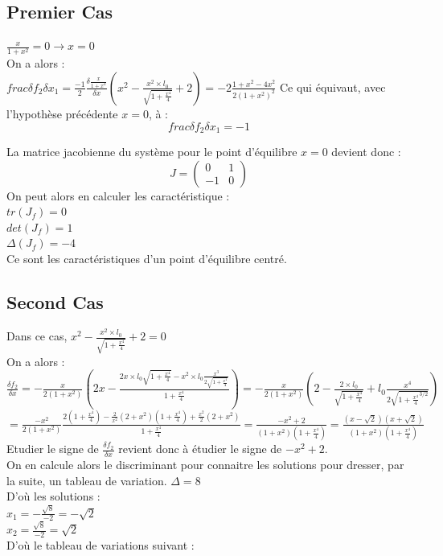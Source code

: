 \documentclass[10pt,a4paper]{article}
\begin{document}
\subsection*{Premier Cas}
$\frac{x}{1+x^2}=0 \longrightarrow x=0$\\
On a alors :\\
$frac{\delta f_2}{\delta x_1}=\frac{-1}{2}\frac{\delta \frac{x}{1+x^2}}{\delta x}(x^2 - \frac{x^2\times l_0}{\sqrt{1+\frac{x^4}{4}}}+2)=-2\frac{1+x^2-4x^2}{2(1+x^2)^2}$
Ce qui équivaut, avec l'hypothèse précédente $x=0$, à :\\
\[frac{\delta f_2}{\delta x_1}=-1\]

La matrice jacobienne du système pour le point d'équilibre $x=0$ devient donc :\\
\[
J=
\begin{pmatrix}
0&1\\
-1&0
\end{pmatrix}
\]
On peut alors en calculer les caractéristique :\\
$tr(J_f) = 0 $\\
$det(J_f) =  1 $\\
$\Delta(J_f) = -4$\\
Ce sont les caractéristiques d'un point d'équilibre centré.\\

\subsection*{Second Cas}
Dans ce cas, $x^2-\frac{x^2\times l_0}{\sqrt{1+\frac{x^4}{4}}}+2=0$\\
On a alors :\\
$\frac{\delta f_2}{\delta x}=-\frac{x}{2(1+x^2)}(2x-\frac{2x\times l_0\sqrt{1+\frac{x^4}{4}}-x^2\times l_0\frac{x^3}{2\sqrt{1+\frac{x^4}{4}}}}{1+\frac{x^4}{4}})=
-\frac{x}{2(1+x^2)}(2-\frac{2\times l_0}{\sqrt{1+\frac{x^4}{4}}}+l_0\frac{x^4}{2\sqrt{1+\frac{x^4}{4}^{3/2}}})$\\$= \frac{-x^2}{2(1+x^2)}\frac{2(1+\frac{x^4}{4})-\frac{2}{x^2}(2+x^2)(1+\frac{x^4}{4})+\frac{x^2}{2}(2+x^2)}{1+\frac{x^4}{4}}=\frac{-x^2+2}{(1+x^2)(1+\frac{x^4}{4})}=\frac{(x-\sqrt{2})(x+\sqrt{2})}{(1+x^2)(1+\frac{x^4}{4})}$\\
Etudier le signe de $\frac{\delta f_2}{\delta x}$ revient donc à étudier le signe de $-x^2+2$.\\
On en calcule alors le discriminant pour connaitre les solutions pour dresser, par la suite, un tableau de variation.
$\Delta = 8$\\
D'où les solutions :\\
$x_1 = -\frac{\sqrt{8}}{-2} = -\sqrt{2}$\\
$x_2 = \frac{\sqrt{8}}{-2} = \sqrt{2}$\\
D'où le tableau de variations suivant :\\
\end{document}
